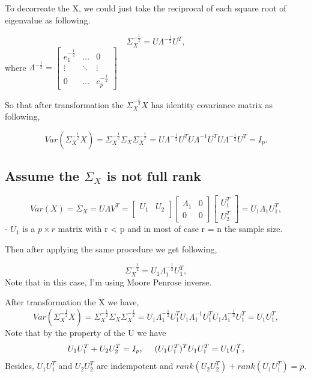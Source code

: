 \documentclass[]{article}
\begin{document}
To decorreate the X, we could just take the reciprocal of each square
root of eigenvalue as following.

\[
  \Sigma^{-\frac{1}{2}}_X = U\Lambda^{-\frac{1}{2}}U^T,
\] where
\(\Lambda^{-\frac{1}{2}} = \begin{bmatrix}  e_1^{-\frac{1}{2}} & \dots & 0 \\  \vdots & \ddots & \vdots \\  0 & \dots & e_p^{-\frac{1}{2}}  \end{bmatrix}\)

So that after transformation the \(\Sigma^{-\frac{1}{2}}_X X\) has
identity covariance matrix as following,

\[
  Var(\Sigma^{-\frac{1}{2}}_X X) = \Sigma^{-\frac{1}{2}}_X \Sigma_X\Sigma^{-\frac{1}{2}}_X = U\Lambda^{-\frac{1}{2}}U^T U\Lambda^{-1}U^T U\Lambda^{-\frac{1}{2}}U^T = I_p.
\]

\subsection{\texorpdfstring{Assume the \(\Sigma_X\) is not full
rank}{Assume the \textbackslash{}Sigma\_X is not full rank}}\label{assume-the-sigma_x-is-not-full-rank}

\[
  Var(X) = \Sigma_X = U\Lambda V^T =
                        \begin{bmatrix}
                         U_1 & U_2\\
                        \end{bmatrix}
                        \begin{bmatrix}
                        \Lambda_1 & 0\\
                        0 & 0
                        \end{bmatrix}
                        \begin{bmatrix}
                        U_1^T \\
                        U_2^T
                        \end{bmatrix} = U_1\Lambda_1U_1^T,
\] - \(U_1\) is a \(p \times r\) matrix with r \textless{} p and in most
of case r = n the sample size.

Then after applying the same procedure we get following,

\[
  \Sigma^{-\frac{1}{2}}_X = U_1\Lambda_1^{-\frac{1}{2}}U_1^T,
\] Note that in this case, I'm using Moore Penrose inverse.

After transformation the X we have, \[
  Var(\Sigma^{-\frac{1}{2}}_X X) = \Sigma^{-\frac{1}{2}}_X \Sigma_X\Sigma^{-\frac{1}{2}}_X = U_1\Lambda^{-\frac{1}{2}}_1U^T_1 U_1\Lambda^{-1}_1U^T_1 U_1\Lambda^{-\frac{1}{2}}_1U^T_1 = U_1U_1^T,  
\] Note that by the property of the U we have \[
  U_1U_1^T + U_2U_2^T = I_p, ~~~~~\\
  (U_1U_1^T)^T U_1U_1^T = U_1U_1^T,
\] Besides, \(U_1U_1^T\) and \(U_2U_2^T\) are indempotent and
\(rank(U_2U_2^T) + rank(U_1U_1^T) = p\).
\end{document}
